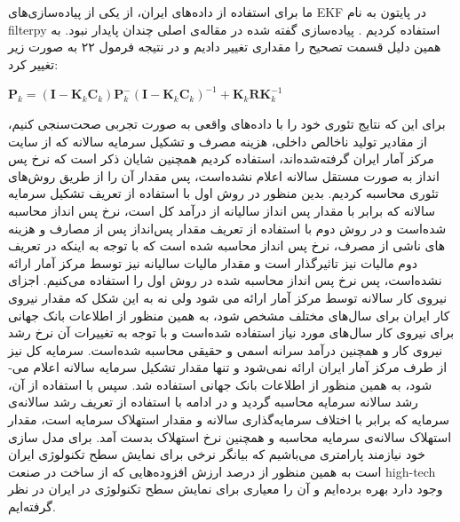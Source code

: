 \documentclass[11pt, fleqn]{article}
\begin{document}
\begin{multicols}{2}
ما برای استفاده از داده‌های ایران، از یکی از پیاده‌سازی‌های 
EKF
در پایتون به نام 
filterpy
استفاده کردیم
\cite{s1}
. پیاده‌سازی گفته شده در مقاله‌ی اصلی چندان پایدار نبود. به همین دلیل قسمت تصحیح را مقداری تغییر دادیم و در نتیجه فرمول ۲۲ به صورت زیر تغییر کرد:

\begin{latin}
$\mathbf{P}_k = (\mathbf{I} - \mathbf{K}_{k} \mathbf{C}_{k}
)\mathbf{P}^{-}_{k} (\mathbf{I} - \mathbf{K}_{k} \mathbf{C}_{k}
)^{-1} + \mathbf{K}_k \mathbf{R} \mathbf{K}_k^{-1} $
\end{latin}






















	برای این که نتایج تئوری خود را با داده‌های واقعی به صورت تجربی صحت‌سنجی کنیم،‌ از 
مقادیر تولید ناخالص داخلی، هزینه مصرف و تشکیل سرمایه سالانه که از سایت مرکز آمار ایران 
\cite{s2}
گرفته‌شده‌اند، استفاده کردیم همچنین شایان ذکر است که نرخ پس­‌انداز به صورت مستقل سالانه اعلام نشده‌است، پس مقدار آن را از طریق روش­‌های تئوری محاسبه کردیم. بدین منظور در روش اول با استفاده از تعریف تشکیل سرمایه سالانه که برابر با مقدار پس انداز سالیانه از درآمد کل است، نرخ پس انداز محاسبه شده‌است و در روش دوم با استفاده از تعریف مقدار پس‌‌انداز پس از مصارف و هزینه­‌های ناشی از مصرف، نرخ پس انداز محاسبه شده است که با توجه به اینکه در تعریف دوم مالیات نیز تاثیرگذار است و مقدار مالیات­ سالیانه نیز توسط مرکز آمار ارائه نشده‌است، پس نرخ پس انداز محاسبه شده در روش اول را استفاده می­‌کنیم. اجزای نیروی کار سالانه توسط مرکز آمار ارائه می ­شود ولی نه به این شکل که مقدار نیروی کار ایران برای سال­‌های مختلف مشخص شود، به همین منظور از اطلاعات بانک جهانی
 \cite{s3}
 برای نیروی کار سال­‌های مورد نیاز استفاده شده‌است و با توجه به تغییرات آن نرخ رشد نیروی کار و همچنین درآمد سرانه اسمی  و حقیقی محاسبه شده‌است. سرمایه کل نیز از طرف مرکز آمار ایران ارائه نمی‌­شود و تنها مقدار تشکیل سرمایه سالانه اعلام می­ شود، به همین منظور از اطلاعات بانک جهانی استفاده شد. سپس با استفاده از آن، رشد سالانه سرمایه محاسبه گردید و در ادامه با استفاده از تعریف رشد سالانه‌ی سرمایه که برابر با اختلاف سرمایه‌گذاری سالانه و مقدار استهلاک سرمایه است، مقدار استهلاک سالانه‌ی سرمایه محاسبه و همچنین نرخ استهلاک بدست آمد. برای مدل سازی خود نیازمند پارامتری می­‌باشیم که بیانگر نرخی برای نمایش سطح تکنولوژی ایران است به همین منظور از درصد ارزش افزوده‌ه­ایی که از ساخت در صنعت high-tech وجود دارد بهره برده‌­ایم و آن را معیاری برای نمایش سطح تکنولوژی در ایران در نظر گرفته‌­ایم.
	

\end{multicols}
\end{document}
